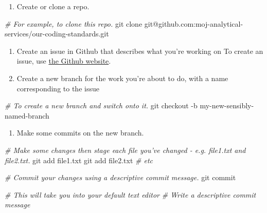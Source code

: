 \documentclass[]{book}
\newenvironment{Shaded}{\begin{snugshade}}{\end{snugshade}}
\newcommand{\CommentTok}[1]{\textcolor[rgb]{0.56,0.35,0.01}{\textit{#1}}}
\newcommand{\FunctionTok}[1]{\textcolor[rgb]{0.00,0.00,0.00}{#1}}
\newcommand{\NormalTok}[1]{#1}
\providecommand{\tightlist}{%
  \setlength{\itemsep}{0pt}\setlength{\parskip}{0pt}}
\begin{document}
\begin{enumerate}
\def\labelenumi{\arabic{enumi}.}
\tightlist
\item
  Create or clone a repo.
\end{enumerate}

\begin{Shaded}
\begin{Highlighting}[]
\CommentTok{# For example, to clone this repo.}
\FunctionTok{git}\NormalTok{ clone git@github.com:moj-analytical-services/our-coding-standards.git}
\end{Highlighting}
\end{Shaded}

\begin{enumerate}
\def\labelenumi{\arabic{enumi}.}
\setcounter{enumi}{1}
\item
  Create an issue in Github that describes what you're working on
  To create an issue, use \href{https://guides.github.com/features/issues/}{the Github website}.
\item
  Create a new branch for the work you're about to do, with a name corresponding to the issue
\end{enumerate}

\begin{Shaded}
\begin{Highlighting}[]
\CommentTok{# To create a new branch and switch onto it.}
\FunctionTok{git}\NormalTok{ checkout -b my-new-sensibly-named-branch}
\end{Highlighting}
\end{Shaded}

\begin{enumerate}
\def\labelenumi{\arabic{enumi}.}
\setcounter{enumi}{3}
\tightlist
\item
  Make some commits on the new branch.
\end{enumerate}

\begin{Shaded}
\begin{Highlighting}[]
\CommentTok{# Make some changes then stage each file you've changed - e.g. file1.txt and file2.txt.}
\FunctionTok{git}\NormalTok{ add file1.txt}
\FunctionTok{git}\NormalTok{ add file2.txt}
\CommentTok{# etc}

\CommentTok{# Commit your changes using a descriptive commit message.}
\FunctionTok{git}\NormalTok{ commit}

\CommentTok{# This will take you into your default text editor}
\CommentTok{# Write a descriptive commit message}
\end{Highlighting}
\end{Shaded}
\end{document}
